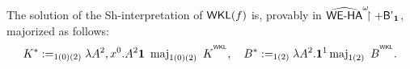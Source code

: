 \begin{prop}
The solution of the Sh-interpretation 
of $\textsf{\upshape WKL}(f)$ is, provably in $\widehat{\textsf{\upshape WE-HA}}^\omega\!\!\!\restriction+\textsf{\upshape B'}_{\mathbf1}$, majorized as follows:
\setcounter{equation}{0}
\[
K^*:=_{1(0)(2)}\lambda A^2,x^0.A^2\one\ \maj_{1(0)(2)}\ K^{^\WKL}, \quad
B^*:=_{1(2)}\lambda A^2. \one^1 \maj_{1(2)}\ B^{^\WKL}
\text{.}
\]
\end{prop}







